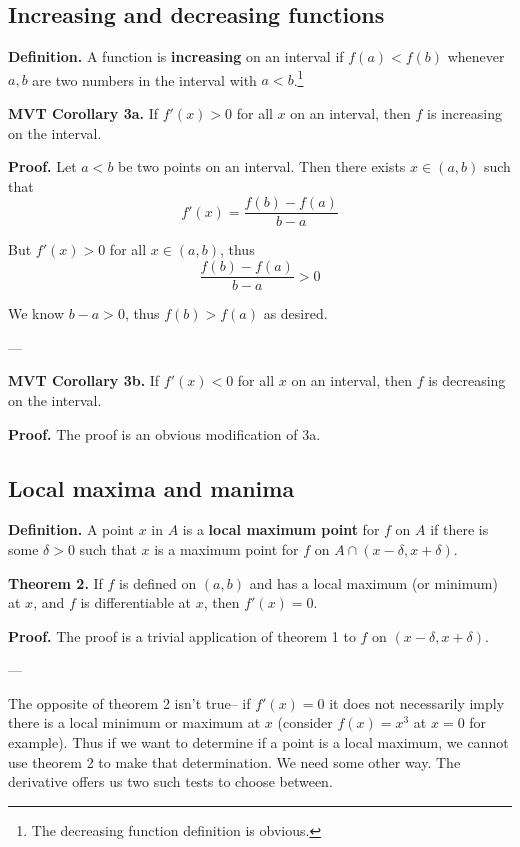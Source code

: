 \subsection{Increasing and decreasing functions}

\textbf{Definition.} A function is \textbf{increasing} on an interval
if $f(a)<f(b)$ whenever $a,b$ are two numbers in the interval with
$a<b$.\footnote{The decreasing function definition is obvious.}

\vs

\textbf{MVT Corollary 3a.} If $f'(x)>0$ for all $x$ on an interval, then
$f$ is increasing on the interval.

\vs

\textbf{Proof.} Let $a<b$ be two points on an interval. Then there
exists $x\in(a,b)$ such that
\[f'(x)=\frac{f(b)-f(a)}{b-a}\]

But $f'(x)>0$ for all $x\in(a,b)$, thus
\[\frac{f(b)-f(a)}{b-a}>0\]

We know $b-a>0$, thus $f(b)>f(a)$ as desired.

\vs---\vs

\textbf{MVT Corollary 3b.} If $f'(x)<0$ for all $x$ on an interval, then
$f$ is decreasing on the interval.

\vs

\textbf{Proof.} The proof is an obvious modification of 3a.

\subsection{Local maxima and manima}
\textbf{Definition.} A point $x$ in $A$ is a \textbf{local maximum
  point} for $f$ on $A$ if there is some $\delta>0$ such that $x$ is a
maximum point for $f$ on $A\cap(x-\delta, x+\delta)$.

\vs

\textbf{Theorem 2.} If $f$ is defined on $(a,b)$ and has a local
maximum (or minimum) at $x$, and $f$ is differentiable at $x$, then
$f'(x)=0$.

\vs

\textbf{Proof.} The proof is a trivial application of theorem 1 to $f$
on $(x-\delta, x+\delta)$.

\vs---\vs

The opposite of theorem 2 isn't true-- if $f'(x)=0$ it does not
necessarily imply there is a local minimum or maximum at $x$ (consider
$f(x)=x^3$ at $x=0$ for example). Thus if we want to determine if a
point is a local maximum, we cannot use theorem 2 to make that
determination. We need some other way. The derivative offers us two
such tests to choose between.

